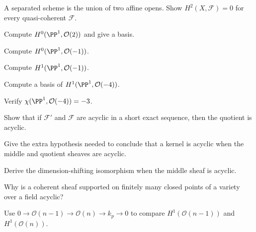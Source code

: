 \begin{exercise}\label{exr:vi49-11}
A separated scheme is the union of two affine opens. Show $H^2(X,\mathcal F)=0$ for every quasi-coherent $\mathcal F$.
\end{exercise}

\begin{exercise}\label{exr:vi49-12}
Compute $H^0(\PP^1,\mathcal O(2))$ and give a basis.
\end{exercise}

\begin{exercise}\label{exr:vi49-13}
Compute $H^0(\PP^1,\mathcal O(-1))$.
\end{exercise}

\begin{exercise}\label{exr:vi49-14}
Compute $H^1(\PP^1,\mathcal O(-1))$.
\end{exercise}

\begin{exercise}\label{exr:vi49-15}
Compute a basis of $H^1(\PP^1,\mathcal O(-4))$.
\end{exercise}

\begin{exercise}\label{exr:vi49-16}
Verify $\chi(\PP^1,\mathcal O(-4))=-3$.
\end{exercise}

\begin{exercise}\label{exr:vi49-17}
Show that if $\mathcal F'$ and $\mathcal F$ are acyclic in a short exact sequence, then the quotient is acyclic.
\end{exercise}

\begin{exercise}\label{exr:vi49-18}
Give the extra hypothesis needed to conclude that a kernel is acyclic when the middle and quotient sheaves are acyclic.
\end{exercise}

\begin{exercise}\label{exr:vi49-19}
Derive the dimension-shifting isomorphism when the middle sheaf is acyclic.
\end{exercise}

\begin{exercise}\label{exr:vi49-20}
Why is a coherent sheaf supported on finitely many closed points of a variety over a field acyclic?
\end{exercise}

\begin{exercise}\label{exr:vi49-21}
Use $0\to\mathcal O(n-1)\to\mathcal O(n)\to k_p\to0$ to compare $H^1(\mathcal O(n-1))$ and $H^1(\mathcal O(n))$.
\end{exercise}

